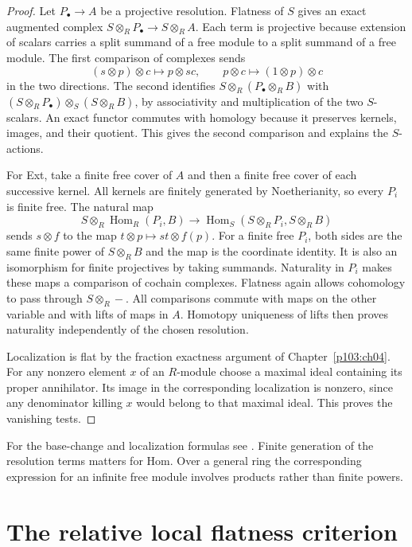 \documentclass[11pt,oneside,openany]{book}
\theoremstyle{definition}
\theoremstyle{remark}
\begin{document}
\begin{proof}
Let \(P_\bullet\to A\) be a projective resolution. Flatness of
\(S\) gives an exact augmented complex \(S\otimes_R P_\bullet\to
S\otimes_R A\). Each term is projective because extension of
scalars carries a split summand of a free module to a split
summand of a free module. The first comparison of complexes
sends
\[
 (s\otimes p)\otimes c\longmapsto p\otimes sc,
 \qquad p\otimes c\longmapsto(1\otimes p)\otimes c
\]
in the two directions. The second identifies
\(S\otimes_R(P_\bullet\otimes_R B)\) with
\((S\otimes_R P_\bullet)\otimes_S(S\otimes_R B)\), by associativity
and multiplication of the two \(S\)-scalars. An exact functor
commutes with homology because it preserves kernels, images,
and their quotient. This gives the second comparison and
explains the \(S\)-actions.

For Ext, take a finite free cover of \(A\) and then a finite free
cover of each successive kernel. All kernels are finitely generated
by Noetherianity, so every \(P_i\) is finite free. The natural map
\[
 S\otimes_R\operatorname{Hom}_R(P_i,B)
 \longrightarrow
 \operatorname{Hom}_S(S\otimes_RP_i,S\otimes_RB)
\]
sends \(s\otimes f\) to the map \(t\otimes p\mapsto st\otimes f(p)\).
For a finite free \(P_i\), both sides are the same finite power
of \(S\otimes_R B\) and the map is the coordinate identity.
It is also an isomorphism for finite projectives by taking
summands. Naturality in \(P_i\) makes these maps a comparison of
cochain complexes. Flatness again allows cohomology to pass
through \(S\otimes_R-\). All comparisons commute with maps on
the other variable and with lifts of maps in \(A\). Homotopy
uniqueness of lifts then proves naturality independently of
the chosen resolution.

Localization is flat by the fraction exactness argument of
Chapter~\ref{p103:ch04}. For any nonzero element \(x\) of an
\(R\)-module choose a maximal ideal containing its proper
annihilator. Its image in the corresponding localization is
nonzero, since any denominator killing \(x\) would belong to
that maximal ideal. This proves the vanishing tests.
\end{proof}
For the base-change and localization formulas see
\cite[Propositions 3.2.9 and 3.3.10 and Corollary 3.3.11]{weibel}.
Finite generation of the resolution terms matters for Hom.
Over a general ring the corresponding expression for an
infinite free module involves products rather than finite powers.

\section{The relative local flatness criterion}
\end{document}
